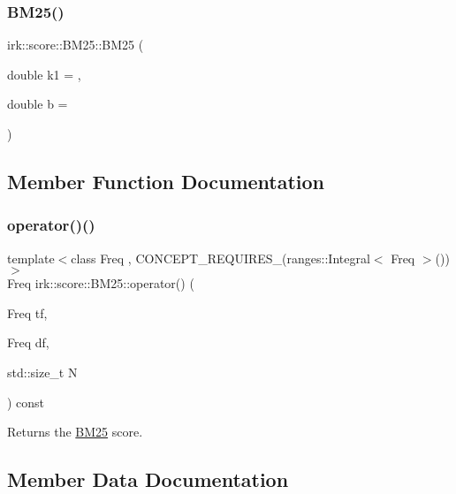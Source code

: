 \subsubsection{\texorpdfstring{B\+M25()}{BM25()}}
{\footnotesize\ttfamily irk\+::score\+::\+B\+M25\+::\+B\+M25 (\begin{DoxyParamCaption}\item[{double}]{k1 = {},  }\item[{double}]{b = {} }\end{DoxyParamCaption})\hspace{0.3cm}{\ttfamily [inline]}}



\subsection{Member Function Documentation}
\mbox{\label{structirk_1_1score_1_1BM25_aab199588e53528b5e8426f6f8b9c237a}} 
\subsubsection{\texorpdfstring{operator()()}{operator()()}}
{\footnotesize\ttfamily template$<$class Freq , C\+O\+N\+C\+E\+P\+T\+\_\+\+R\+E\+Q\+U\+I\+R\+E\+S\+\_\+(ranges\+::\+Integral$<$ Freq $>$()) $>$ \\
Freq irk\+::score\+::\+B\+M25\+::operator() (\begin{DoxyParamCaption}\item[{Freq}]{tf,  }\item[{Freq}]{df,  }\item[{std\+::size\+\_\+t}]{N }\end{DoxyParamCaption}) const\hspace{0.3cm}{\ttfamily [inline]}}



Returns the \mbox{\hyperlink{structirk_1_1score_1_1BM25}{B\+M25}} score. 



\subsection{Member Data Documentation}
\mbox{\label{structirk_1_1score_1_1BM25_ac6585ade6f9f049fda74c625a5f4747c}} 
